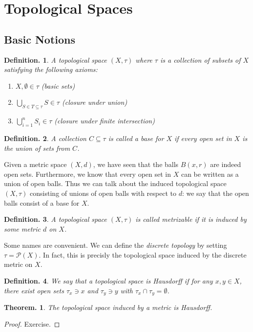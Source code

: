 \documentclass[11pt, a4paper]{memoir}
\theoremstyle{change}
\newtheorem{theorem}{Theorem.}[section]
\theoremstyle{plain}
\theoremstyle{nonumberplain}
\newtheorem{definition}{Definition.}
\newtheorem{proof}{Proof}
\numberwithin{equation}{section}
\begin{document}
\section{Topological Spaces}
\subsection{Basic Notions}
\begin{definition}
    A \textit{topological space} $(X,\tau)$ where $\tau$ is a collection of subsets of $X$ satisfying the following axioms:
    \begin{enumerate}
        \item $X,\emptyset\in\tau$ (basic sets)
        \item $\displaystyle\bigcup\limits_{S\in T\subseteq\tau}S\in\tau$ (closure under union)
        \item $\displaystyle\bigcup\limits_{i=1}^n S_i\in\tau$ (closure under finite intersection)
    \end{enumerate}
\end{definition}
\begin{definition}
    A collection $C\subseteq\tau$ is called a \textit{base} for $X$ if every open set in $X$ is the union of sets from $C$.
\end{definition}
Given a metric space $(X,d)$, we have seen that the balls $B(x,r)$ are indeed open sets.
Furthermore, we know that every open set in $X$ can be written as a union of open balls.
Thus we can talk about the induced topological space $(X,\tau)$ consisting of unions of open balls with respect to $d$: we say that the open balls consist of a base for $X$.
\begin{definition}
    A topological space $(X,\tau)$ is called \textit{metrizable} if it is induced by some metric $d$ on $X$.
\end{definition}
Some names are convenient.
We can define the \textit{discrete topology} by setting $\tau=\mathcal{P}(X)$.
In fact, this is precisly the topological space induced by the discrete metric on $X$.
\begin{definition}
    We say that a topological space is Hausdorff if for any $x,y\in X$, there exist open sets $\tau_x\ni x$ and $\tau_y\ni y$ with $\tau_x\cap\tau_y=\emptyset$.
\end{definition}
\begin{theorem}
    The topological space induced by a metric is Hausdorff.
\end{theorem}
\begin{proof}
    Exercise.
\end{proof}
\end{document}
